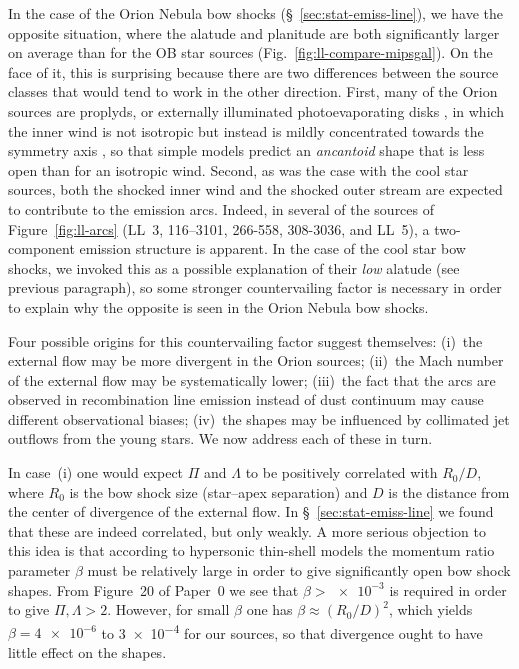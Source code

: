 \documentclass[useAMS, usenatbib, a4paper]{mnras}
\begin{document}
In the case of the Orion Nebula bow shocks
(\S~\ref{sec:stat-emiss-line}), we have the opposite situation, where
the alatude and planitude are both significantly larger on average
than for the OB star sources (Fig.~\ref{fig:ll-compare-mipsgal}).  On
the face of it, this is surprising because there are two differences
between the source classes that would tend to work in the other
direction.  First, many of the Orion sources are proplyds, or
externally illuminated photoevaporating disks \citep{ODell:2008b}, in
which the inner wind is not isotropic but instead is mildly
concentrated towards the symmetry axis \citep{Garcia-Arredondo:2001a},
so that simple models predict an \textit{ancantoid} shape
\citep[\S~5]{Tarango-Yong:2018a} that is less open than for an
isotropic wind.  Second, as was the case with the cool star sources,
both the shocked inner wind and the shocked outer stream are expected
to contribute to the emission arcs.  Indeed, in several of the sources
of Figure~\ref{fig:ll-arcs} (LL~3, 116--3101, 266-558, 308-3036, and
LL~5), a two-component emission structure is apparent.  In the case of
the cool star bow shocks, we invoked this as a possible explanation of
their \emph{low} alatude (see previous paragraph), so
some stronger countervailing factor is necessary in order to explain
why the opposite is seen in the Orion Nebula bow shocks.


Four possible origins for this countervailing factor suggest
themselves: (i)~the external flow may be more divergent in the Orion
sources; (ii)~the Mach number of the external flow may be
systematically lower; (iii)~the fact that the arcs are observed in
recombination line emission instead of dust continuum may cause
different observational biases; (iv)~the shapes may be influenced by
collimated jet outflows from the young stars.  We now address each of
these in turn.

In case~(i) one would expect \(\Pi\) and \(\Lambda\) to be positively
correlated with \(R_0/D\), where \(R_0\) is the bow shock size
(star--apex separation) and \(D\) is the distance from the center of
divergence of the external flow.  In \S~\ref{sec:stat-emiss-line} we
found that these are indeed correlated, but only weakly.  A more
serious objection to this idea is that according to hypersonic
thin-shell models \citep{Canto:1996} the momentum ratio parameter
\(\beta\) must be relatively large in order to give significantly open bow
shock shapes.  From Figure~20 of Paper~0 we see that
\(\beta > \num{e-3}\) is required in order to give
\(\Pi, \Lambda > 2\).  However, for small \(\beta\) one has
\(\beta \approx (R_0/D)^2\), which yields \(\beta = \num{4e-6}\) to \num{3e-4} for
our sources, so that divergence ought to have little effect on the
shapes.
\end{document}
